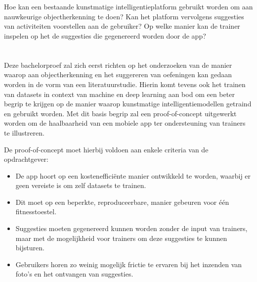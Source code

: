 \section{}
\label{sec:onderzoeksvraag}
Hoe kan een bestaande kunstmatige intelligentieplatform gebruikt worden om aan nauwkeurige objectherkenning te doen?
Kan het platform vervolgens suggesties van activiteiten voorstellen aan de gebruiker?
Op welke manier kan de trainer inspelen op het de suggesties die gegenereerd worden door de app?

\section{}
\label{sec:onderzoeksdoelstelling}
Deze bachelorproef zal zich eerst richten op het onderzoeken van de manier waarop aan objectherkenning en het suggereren van oefeningen kan gedaan worden in de vorm van een literatuurstudie.
Hierin komt tevens ook het trainen van datasets in context van machine en deep learning aan bod om een beter begrip te krijgen op de manier waarop kunstmatige intelligentiemodellen getraind en gebruikt worden.
Met dit basis begrip zal een proof-of-concept uitgewerkt worden om de haalbaarheid van een mobiele app ter ondersteuning van trainers te illustreren.

De proof-of-concept moet hierbij voldoen aan enkele criteria van de opdrachtgever:
\begin{itemize}
    \item De app hoort op een kosteneffici\"ente manier ontwikkeld te worden, waarbij er geen vereiste is om zelf datasets te trainen.
    \item Dit moet op een beperkte, reproduceerbare, manier gebeuren voor \'e\'en fitnesstoestel.
    \item Suggesties moeten gegenereerd kunnen worden zonder de input van trainers, maar met de mogelijkheid voor trainers om deze suggesties te kunnen bijsturen.
    \item Gebruikers horen zo weinig mogelijk frictie te ervaren bij het inzenden van foto's en het ontvangen van suggesties.
\end{itemize}

